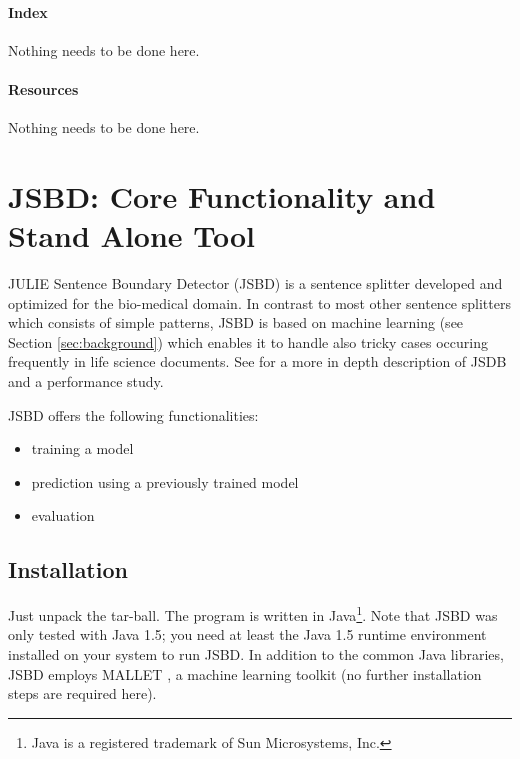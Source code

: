 \documentclass[11pt,a4paper,halfparskip]{scrartcl}
\begin{document}
\paragraph{Index}
Nothing needs to be done here.

\paragraph{Resources}
Nothing needs to be done here.




\clearpage
\section{JSBD: Core Functionality and Stand Alone Tool}
\label{sec_objective}

JULIE Sentence Boundary Detector (JSBD) is a sentence splitter
developed and optimized for the bio-medical domain. In contrast to
most other sentence splitters which consists of simple patterns, JSBD
is based on machine learning (see Section \ref{sec:background}) which
enables it to handle also tricky cases occuring frequently in life
science documents. See \cite{tomanek.medinfo07} for a more in depth
description of JSDB and a performance study.


JSBD offers the following functionalities:
\begin{itemize}
\item training a model
\item prediction using a previously trained model
\item evaluation
\end{itemize}





\subsection{Installation}
Just unpack the tar-ball. The program is written in Java\footnote{Java
  is a registered trademark of Sun Microsystems, Inc.}. Note that JSBD
was only tested with Java 1.5; you need at least the Java 1.5 runtime
environment installed on your system to run JSBD. In addition to the
common Java libraries, JSBD employs \textsc{MALLET} \cite{mallet}, a
machine learning toolkit (no further installation steps are
required here).
\end{document}
